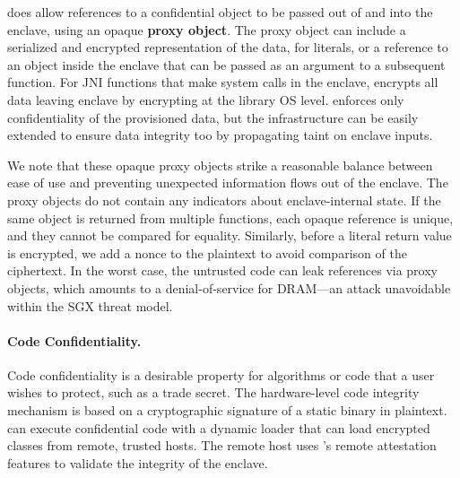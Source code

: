 \systemname{} does allow references to a confidential object to be
passed out of and into the enclave, using an opaque {\bf proxy object}.
The proxy object can include a serialized and encrypted representation of the data, for literals,
or a reference to an object inside the enclave that can be passed as an argument to a subsequent function.
For JNI functions that make system calls in the enclave, \systemname{} encrypts all data leaving enclave by encrypting at the library OS level.
\systemname{} enforces only confidentiality of the provisioned data, but the infrastructure can be easily extended to ensure data integrity too by propagating taint on enclave inputs.

We note that these opaque proxy objects strike a reasonable balance between
ease of use and preventing unexpected information flows out of the enclave.
The proxy objects do not contain any indicators about enclave-internal state.
If the same object is returned from multiple functions, each opaque reference is unique, and they cannot be compared for equality.
Similarly, before a literal return value is encrypted, we add a nonce to the plaintext to avoid comparison of the ciphertext.
In the worst case, the untrusted code can leak references via proxy objects, which amounts to a denial-of-service for DRAM---an attack
unavoidable within the SGX threat model.




\paragraph{Code Confidentiality.}
Code confidentiality is a desirable property for algorithms or code that 
a user wishes to protect, such as a trade secret.
The hardware-level \sgx{} code integrity mechanism is based on a cryptographic
signature of a static binary in plaintext.
\systemname{} can execute confidential code with a dynamic loader that can 
load encrypted classes from remote, trusted hosts.
The remote host uses \sgx{}'s remote attestation features to validate the integrity of the \systemname{} enclave.

